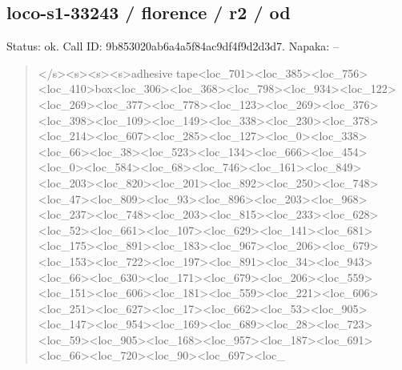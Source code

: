 \documentclass[10pt,a4paper]{article}
\begin{document}
\subsection*{loco-s1-33243 / florence / r2 / od}
Status: ok. Call ID: 9b853020ab6a4a5f84ac9df4f9d2d3d7. Napaka: --
\begin{quote}\footnotesize
</s>\allowbreak{}<s>\allowbreak{}<s>\allowbreak{}<s>\allowbreak{}adhesive tape<loc\_701>\allowbreak{}<loc\_385>\allowbreak{}<loc\_756>\allowbreak{}<\allowbreak{}loc\_410>\allowbreak{}box<loc\_306>\allowbreak{}<loc\_368>\allowbreak{}<lo\allowbreak{}c\_798>\allowbreak{}<loc\_934>\allowbreak{}<loc\_122>\allowbreak{}<loc\_269\allowbreak{}>\allowbreak{}<loc\_377>\allowbreak{}<loc\_778>\allowbreak{}<loc\_123>\allowbreak{}<loc\allowbreak{}\_269>\allowbreak{}<loc\_376>\allowbreak{}<loc\_398>\allowbreak{}<loc\_109>\allowbreak{}\allowbreak{}<loc\_149>\allowbreak{}<loc\_338>\allowbreak{}<loc\_230>\allowbreak{}<loc\_\allowbreak{}378>\allowbreak{}<loc\_214>\allowbreak{}<loc\_607>\allowbreak{}<loc\_285>\allowbreak{}<\allowbreak{}loc\_127>\allowbreak{}<loc\_0>\allowbreak{}<loc\_338>\allowbreak{}<loc\_66>\allowbreak{}\allowbreak{}<loc\_38>\allowbreak{}<loc\_523>\allowbreak{}<loc\_134>\allowbreak{}<loc\_6\allowbreak{}66>\allowbreak{}<loc\_454>\allowbreak{}<loc\_0>\allowbreak{}<loc\_584>\allowbreak{}<loc\allowbreak{}\_68>\allowbreak{}<loc\_746>\allowbreak{}<loc\_161>\allowbreak{}<loc\_849>\allowbreak{}<\allowbreak{}loc\_203>\allowbreak{}<loc\_820>\allowbreak{}<loc\_201>\allowbreak{}<loc\_8\allowbreak{}92>\allowbreak{}<loc\_250>\allowbreak{}<loc\_748>\allowbreak{}<loc\_47>\allowbreak{}<lo\allowbreak{}c\_809>\allowbreak{}<loc\_93>\allowbreak{}<loc\_896>\allowbreak{}<loc\_203>\allowbreak{}\allowbreak{}<loc\_968>\allowbreak{}<loc\_237>\allowbreak{}<loc\_748>\allowbreak{}<loc\_\allowbreak{}203>\allowbreak{}<loc\_815>\allowbreak{}<loc\_233>\allowbreak{}<loc\_628>\allowbreak{}<\allowbreak{}loc\_52>\allowbreak{}<loc\_661>\allowbreak{}<loc\_107>\allowbreak{}<loc\_62\allowbreak{}9>\allowbreak{}<loc\_141>\allowbreak{}<loc\_681>\allowbreak{}<loc\_175>\allowbreak{}<lo\allowbreak{}c\_891>\allowbreak{}<loc\_183>\allowbreak{}<loc\_967>\allowbreak{}<loc\_206\allowbreak{}>\allowbreak{}<loc\_679>\allowbreak{}<loc\_153>\allowbreak{}<loc\_722>\allowbreak{}<loc\allowbreak{}\_197>\allowbreak{}<loc\_891>\allowbreak{}<loc\_34>\allowbreak{}<loc\_943>\allowbreak{}<\allowbreak{}loc\_66>\allowbreak{}<loc\_630>\allowbreak{}<loc\_171>\allowbreak{}<loc\_67\allowbreak{}9>\allowbreak{}<loc\_206>\allowbreak{}<loc\_559>\allowbreak{}<loc\_151>\allowbreak{}<lo\allowbreak{}c\_606>\allowbreak{}<loc\_181>\allowbreak{}<loc\_559>\allowbreak{}<loc\_221\allowbreak{}>\allowbreak{}<loc\_606>\allowbreak{}<loc\_251>\allowbreak{}<loc\_627>\allowbreak{}<loc\allowbreak{}\_17>\allowbreak{}<loc\_662>\allowbreak{}<loc\_53>\allowbreak{}<loc\_905>\allowbreak{}<l\allowbreak{}oc\_147>\allowbreak{}<loc\_954>\allowbreak{}<loc\_169>\allowbreak{}<loc\_68\allowbreak{}9>\allowbreak{}<loc\_28>\allowbreak{}<loc\_723>\allowbreak{}<loc\_59>\allowbreak{}<loc\_\allowbreak{}905>\allowbreak{}<loc\_168>\allowbreak{}<loc\_957>\allowbreak{}<loc\_187>\allowbreak{}<\allowbreak{}loc\_691>\allowbreak{}<loc\_66>\allowbreak{}<loc\_720>\allowbreak{}<loc\_90\allowbreak{}>\allowbreak{}<loc\_697>\allowbreak{}<loc\_
\end{quote}
\end{document}
